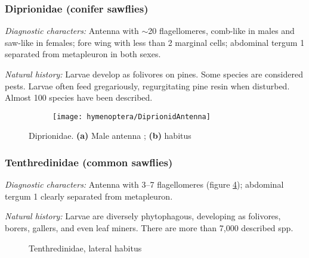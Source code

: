 \subsubsection{Diprionidae (conifer sawflies)}
\noindent{}\textit{Diagnostic characters:} Antenna with $\sim$20 flagellomeres, comb-like in males and saw-like in females; fore wing with less than 2 marginal cells; abdominal tergum 1 separated from metapleuron in both sexes.\vspace{3mm}

\noindent{}\textit{Natural history:} Larvae develop as folivores on pines. Some species are considered pests. Larvae often feed gregariously, regurgitating pine resin when disturbed. Almost 100 species have been described.

\begin{figure}[ht!]
    \centering
    \begin{subfigure}[ht!]{0.14\textwidth}
        \texttt{[image: hymenoptera/DiprionidAntenna]}
        \caption{}
        \label{fig:diprionid1}
    \end{subfigure}
    \qquad
    \begin{subfigure}[ht!]{0.42\textwidth}
        \caption{}
        \label{fig:diprionid2}
    \end{subfigure}
    \caption{Diprionidae. \textbf{(a)} Male antenna \citep[][pg. 108]{goulet1993hymenoptera}; \textbf{(b)} habitus \citep[][Fig. 29]{goulet1993hymenoptera}}\label{fig:diprion}
\end{figure}

\subsubsection{Tenthredinidae (common sawflies)}
\noindent{}\textit{Diagnostic characters:} Antenna with 3--7 flagellomeres (figure \ref{fig:tenthred1}); abdominal tergum 1 clearly separated from metapleuron.\vspace{3mm}

\noindent{}\textit{Natural history:} Larvae are diversely phytophagous, developing as folivores, borers, gallers, and even leaf miners. There are more than 7,000 described spp.

\begin{figure}[ht!]
  \centering
  \caption{Tenthredinidae, lateral habitus \citep[][Fig. 31]{goulet1993hymenoptera}}
  \label{fig:tenthred1}
\end{figure}

